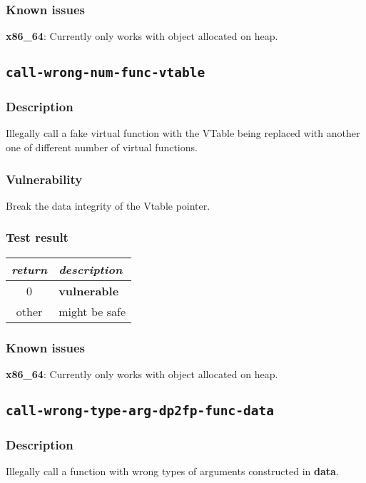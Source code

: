 \documentclass[a4paper]{book}
\begin{document}
\subsubsection{Known issues}

\textbf{x86\_64}: Currently only works with object allocated on heap.

\newpage
\subsection{\texttt{call-wrong-num-func-vtable}}\label{test-call-wrong-num-func-vtable}

\subsubsection{Description}
Illegally call a fake virtual function with the VTable being replaced with another one of different number of virtual functions.

\subsubsection{Vulnerability}
Break the data integrity of the Vtable pointer.

\subsubsection{Test result}
\begin{tabular}{cl}
  \toprule
  \emph{return}  & \emph{description} \\
  \midrule
  0              & \textbf{vulnerable} \\
  other          & might be safe \\
  \bottomrule
\end{tabular}

\subsubsection{Known issues}

\textbf{x86\_64}: Currently only works with object allocated on heap.

\newpage
\subsection{\texttt{call-wrong-type-arg-dp2fp-func-data}}\label{test-call-wrong-type-arg-dp2fp-func-data}

\subsubsection{Description}
Illegally call a function with wrong types of arguments constructed in \textbf{data}.
\end{document}
